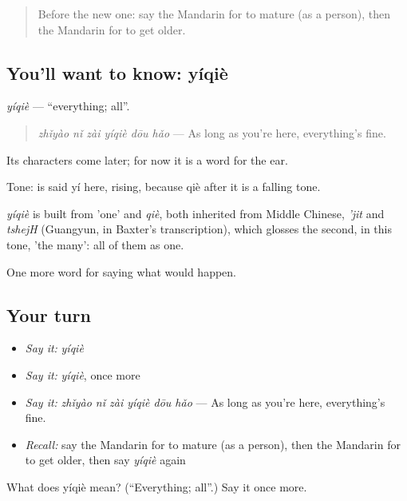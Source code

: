\begin{quote}
Before the new one: say the Mandarin for to mature (as a person), then the Mandarin for to get older.
\end{quote}

\subsection*{You'll want to know: yíqiè}
\emph{yíqiè} — \textquotedblleft{}everything; all\textquotedblright{}.

\begin{quote}
\emph{zhǐyào nǐ zài yíqiè dōu hǎo} — As long as you're here, everything's fine.
\end{quote}

Its characters come later; for now it is a word for the ear.

Tone:  is said yí here, rising, because qiè after it is a falling tone.

\begin{cousinweb}
\emph{yíqiè} is built from  'one' and \emph{qiè}, both inherited from Middle Chinese, \emph{'jit} and \emph{tshejH} (Guangyun, in Baxter's transcription), which glosses the second, in this tone, 'the many': all of them as one.
\end{cousinweb}

\begin{grammarlens}[title={What you've built}]
One more word for saying what would happen.
\end{grammarlens}

\subsection*{Your turn}
\begin{itemize}
\raggedright
  \item \emph{Say it:} \emph{yíqiè}
  \item \emph{Say it:} \emph{yíqiè}, once more
  \item \emph{Say it:} \emph{zhǐyào nǐ zài yíqiè dōu hǎo} — As long as you're here, everything's fine.
  \item \emph{Recall:} say the Mandarin for to mature (as a person), then the Mandarin for to get older, then say \emph{yíqiè} again
\end{itemize}

\begin{tcolorbox}[breakable,colback=teal!4,colframe=teal!35!black,title={Before you move on}]
What does yíqiè mean? (\textquotedblleft{}Everything; all\textquotedblright{}.) Say it once more.
\end{tcolorbox}
